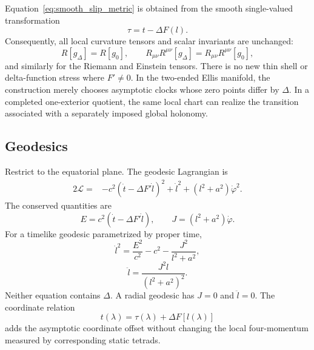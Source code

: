 \documentclass[journal,a4paper]{IEEEtran}
\begin{document}
Equation~\eqref{eq:smooth_slip_metric} is obtained from the smooth single-valued transformation
\begin{equation}
    \tau=t-\Delta F(l).
\end{equation}
Consequently, all local curvature tensors and scalar invariants are unchanged:
\begin{equation}
    R[g_\Delta]=R[g_0],
    \qquad
    R_{\mu\nu}R^{\mu\nu}[g_\Delta]
    =R_{\mu\nu}R^{\mu\nu}[g_0],
\end{equation}
and similarly for the Riemann and Einstein tensors. There is no new thin shell or delta-function stress where \(F'\neq0\). In the two-ended Ellis manifold, the construction merely chooses asymptotic clocks whose zero points differ by \(\Delta\). In a completed one-exterior quotient, the same local chart can realize the transition associated with a separately imposed global holonomy.

\subsection{Geodesics}

Restrict to the equatorial plane. The geodesic Lagrangian is
\begin{equation}
\begin{split}
2\mathcal L={}&
-c^2(\dot t-\Delta F'\dot l)^2
+\dot l^2
+(l^2+a^2)\dot\varphi^2.
\end{split}
\end{equation}
The conserved quantities are
\begin{equation}
    E=c^2(\dot t-\Delta F'\dot l),
    \qquad
    J=(l^2+a^2)\dot\varphi.
\end{equation}
For a timelike geodesic parametrized by proper time,
\begin{equation}
    \boxed{
    \dot l^2
    =\frac{E^2}{c^2}-c^2
    -\frac{J^2}{l^2+a^2},
    }
    \label{eq:ellis_radial_first_integral}
\end{equation}
\begin{equation}
    \boxed{
    \ddot l
    =\frac{J^2l}{(l^2+a^2)^2}.
    }
    \label{eq:ellis_radial_acceleration}
\end{equation}
Neither equation contains \(\Delta\). A radial geodesic has \(J=0\) and \(\ddot l=0\). The coordinate relation
\begin{equation}
    t(\lambda)=\tau(\lambda)+\Delta F[l(\lambda)]
\end{equation}
adds the asymptotic coordinate offset without changing the local four-momentum measured by corresponding static tetrads.
\end{document}
